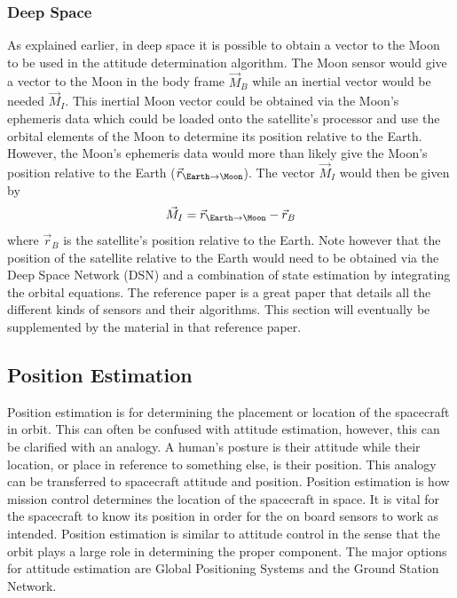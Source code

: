 \documentclass{article}
\begin{document}
\subsubsection{Deep Space}

As explained earlier, in deep space it is possible to obtain a vector
to the Moon to be used in the attitude determination algorithm. The
Moon sensor would give a vector to the Moon in the body frame
$\vec{M}_B$ while an inertial vector would be needed $\vec{M}_I$. This
inertial Moon vector could be obtained via the Moon's
ephemeris data which could be loaded onto the satellite's processor
and use the orbital elements of the Moon to determine its position
relative to the Earth. However, the Moon's ephemeris data would more
than likely give the Moon's position relative to the Earth
($\vec{r}_{\Earth \rightarrow \Moon}$). The vector $\vec{M}_I$ would
then be given by
\begin{equation}
  \vec{M}_I = \vec{r}_{\Earth \rightarrow \Moon} - \vec{r}_{B}
\end{equation}
where $\vec{r}_B$ is the satellite's position relative to the
Earth. Note however that the position of the satellite relative to the
Earth would need to be obtained via the Deep Space Network (DSN) and a
combination of state estimation by integrating the orbital
equations. The reference paper \cite{Munoz} is a great paper that
details all the different kinds of sensors and their algorithms. This
section will eventually be supplemented by the material in that
reference paper.

\subsection{Position Estimation}

Position estimation is for determining the placement or location of
the spacecraft in orbit. This can often be confused with attitude
estimation, however, this can be clarified with an analogy. A human's
posture is their attitude while their location, or place in reference
to something else, is their position. This analogy can be transferred
to spacecraft attitude and position. Position estimation is how
mission control determines the location of the spacecraft in space. It
is vital for the spacecraft to know its position in order for the on
board sensors to work as intended. Position estimation is similar to
attitude control in the sense that the orbit plays a large role in
determining the proper component. The major options for attitude
estimation are Global Positioning Systems and the Ground Station
Network. 
\end{document}
